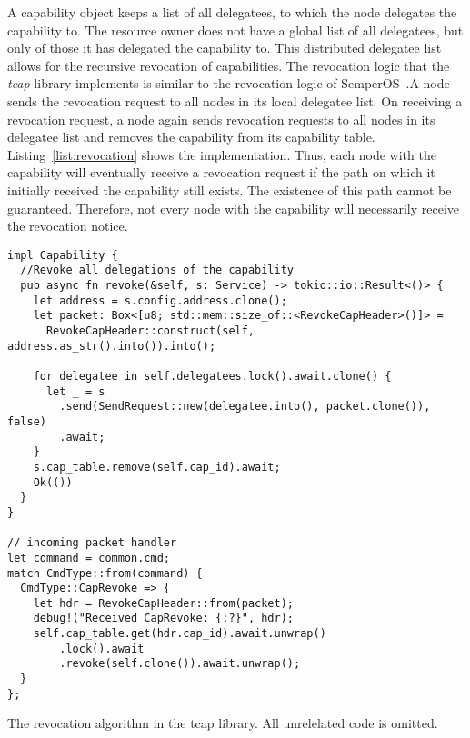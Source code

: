 A capability object keeps a list of all delegatees, to which the node delegates the capability to. The resource owner does not have a global list of all delegatees, but only of those it has delegated the capability to. This distributed delegatee list allows for the recursive revocation of capabilities. The revocation logic that the \emph{tcap} library implements is similar to the revocation logic of SemperOS~\cite{hilleSemperOSDistributedCapability2019}.\@ A node sends the revocation request to all nodes in its local delegatee list. On receiving a revocation request, a node again sends revocation requests to all nodes in its delegatee list and removes the capability from its capability table. Listing~\ref{list:revocation} shows the implementation. Thus, each node with the capability will eventually receive a revocation request if the path on which it initially received the capability still exists. The existence of this path cannot be guaranteed. Therefore, not every node with the capability will necessarily receive the revocation notice.
\begin{listing}
  \begin{verbatim}
impl Capability {
  //Revoke all delegations of the capability
  pub async fn revoke(&self, s: Service) -> tokio::io::Result<()> {
    let address = s.config.address.clone();
    let packet: Box<[u8; std::mem::size_of::<RevokeCapHeader>()]> =
      RevokeCapHeader::construct(self, address.as_str().into()).into();

    for delegatee in self.delegatees.lock().await.clone() {
      let _ = s
        .send(SendRequest::new(delegatee.into(), packet.clone()), false)
        .await;
    }
    s.cap_table.remove(self.cap_id).await;
    Ok(())
  }
}

// incoming packet handler
let command = common.cmd;
match CmdType::from(command) {
  CmdType::CapRevoke => {
    let hdr = RevokeCapHeader::from(packet);
    debug!("Received CapRevoke: {:?}", hdr);
    self.cap_table.get(hdr.cap_id).await.unwrap()
        .lock().await
        .revoke(self.clone()).await.unwrap();
  }
};
  \end{verbatim}
\caption{\label{list:revocation} The revocation algorithm in the tcap library. All unrelelated code is omitted.}
\end{listing}
